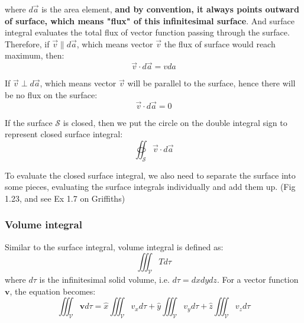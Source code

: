 \documentclass[12pt,a4paper,twoside]{article}
\begin{document}
	where \(d\overrightarrow{a}\) is the area element, \textbf{and by convention, it always points outward of surface, which means "flux" of this infinitesimal surface}. And surface integral evaluates the total flux of vector function passing through the surface.\\
	
	\noindent Therefore, if \(\overrightarrow{v}\parallel d\overrightarrow{a}\), which means vector \(\overrightarrow{v}\) the flux of surface would reach maximum, then:
	\[\overrightarrow{v}\cdot d\overrightarrow{a}=vda\]
	
	If \(\overrightarrow{v}\perp d\overrightarrow{a}\), which means vector \(\overrightarrow{v}\) will be parallel to the surface, hence there will be no flux on the surface:
	\[\overrightarrow{v}\cdot d\overrightarrow{a}=0\]
	
	If the surface \(\mathcal{S}\) is closed, then we put the circle on the double integral sign to represent closed surface integral:
	\[\oiint_\mathcal{S} \overrightarrow{v} \cdot d\overrightarrow{a}\]
	
	To evaluate the closed surface integral, we also need to separate the surface into some pieces, evaluating the surface integrals individually and add them up. (Fig 1.23, and see Ex 1.7 on Griffiths)
	\subsubsection{Volume integral}
	Similar to the surface integral, volume integral is defined as:
	\begin{equation}
		\iiint_\mathcal{V} T d\tau
	\end{equation}
	where \(d\tau \) is the infinitesimal solid volume, i.e. \(d\tau=dxdydz\). For a vector function \(\textbf{v}\), the equation becomes:
	\[\iiint_\mathcal{V}\textbf{v} d\tau=\hat{x}\iiint_\mathcal{V} v_xd\tau+\hat{y}\iiint_\mathcal{V}v_yd\tau+\hat{z}\iiint_\mathcal{V}v_zd\tau\]
	
	
\end{document}
